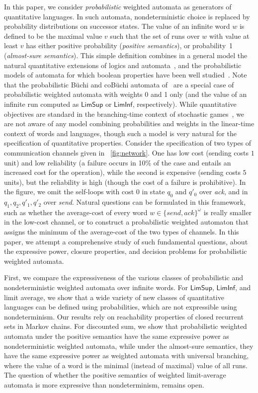\documentclass{llncs}
\newcommand{\LimSup}{\mathsf{LimSup}}
\newcommand{\LimInf}{\mathsf{LimInf}}
\begin{document}
In this paper, we consider \emph{probabilistic} weighted automata as
generators of quantitative languages.  In such automata,
nondeterministic choice is replaced by probability distributions on
successor states.  The value of an infinite word $w$ is defined to be
the maximal value $v$ such that the set of runs over $w$ with value at
least $v$ has either positive probability (\emph{positive semantics}),
or probability~1 (\emph{almost-sure semantics}). 
This simple definition combines in a general model the natural quantitative extensions 
of logics and automata~\cite{AlfaroFS04,DrosteK06,CDH08a}, and the probabilistic 
models of automata for which boolean properties have been well studied~\cite{Rabin63,BlondelC03,BG05}.
Note that the probabilistic B\"uchi and coB\"uchi automata of~\cite{BG05} are 
a special case of probabilistic weighted automata with weights 0 and 1 only 
(and the value of an infinite run computed as $\LimSup$ or $\LimInf$,
respectively). 
While quantitative objectives are standard in the branching-time context of
stochastic games~\cite{Sha53,EM79,FV97,CAHS03,CJH04,Gimbert06},
we are not aware of any model combining probabilities and weights in the 
linear-time context of words and languages, though such a model is very natural
for the specification of quantitative properties. Consider the 
specification of two types of communication channels given in \figurename~\ref{fig:network}.
One has low cost (sending costs $1$ unit) and low reliability
(a failure occurs in 10\% of the case and entails an increased cost for the 
operation), while the second is expensive (sending costs $5$ units),
but the reliability is high (though the cost of a failure is prohibitive).
In the figure, we omit the self-loops with cost $0$ in state $q_0$ and $q'_0$
over {\it ack}, and in $q_1,q_2,q'_1,q'_2$ over {\it send}.
Natural questions can be formulated in this framework, such as whether
the average-cost of every word $w \in \{send,ack\}^\omega$ is really 
smaller in the low-cost channel, or to construct a probabilistic weighted 
automaton that assigns the minimum of the average-cost of the two types
of channels.
In this paper, we attempt a comprehensive study of such fundamental questions, 
about the expressive power, closure properties, and decision problems for 
probabilistic weighted automata.

First, we compare the expressiveness of the various classes of
probabilistic and nondeterministic weighted automata over infinite
words.  For $\LimSup$, $\LimInf$, and limit average, we show that a
wide variety of new classes of quantitative languages can be defined
using probabilities, which are not expressible using nondeterminism.
Our results rely on reachability properties of closed recurrent sets
in Markov chains.  For discounted sum, we show that probabilistic
weighted automata under the positive semantics have the same
expressive power as nondeterministic weighted automata, while under
the almost-sure semantics, they have the same expressive power as
weighted automata with universal branching, where the value of a word
is the minimal (instead of maximal) value of all runs.
The question of whether the positive semantics of weighted limit-average
automata is more expressive than nondeterminism, remains open.
\end{document}
